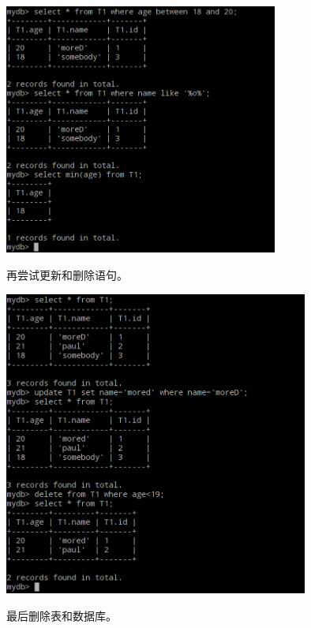 \documentclass[11pt, a4paper]{article}
\makeatletter
\newcommand\fcaption{\def\@captype{figure}\caption}
\makeatother
\begin{document}
\begin{center}
    \includegraphics[width=9cm]{fig/query2}
    \fcaption{查询3}
\end{center}

再尝试更新和删除语句。

\begin{center}
    \includegraphics[width=10cm]{fig/update-delete}
    \fcaption{更新和删除}
\end{center}

最后删除表和数据库。
\end{document}

